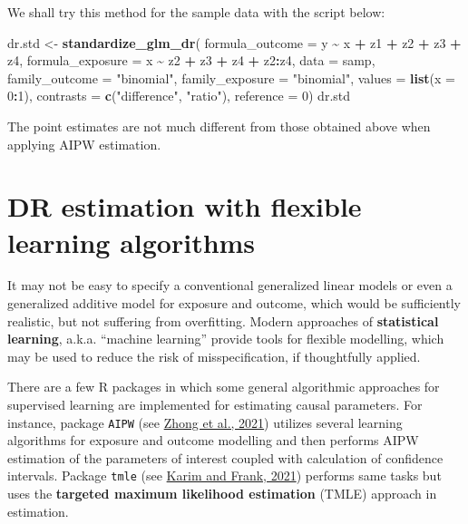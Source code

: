 \documentclass[
]{book}
\newenvironment{Shaded}{\begin{snugshade}}{\end{snugshade}}
\newcommand{\AttributeTok}[1]{\textcolor[rgb]{0.13,0.29,0.53}{#1}}
\newcommand{\DecValTok}[1]{\textcolor[rgb]{0.00,0.00,0.81}{#1}}
\newcommand{\FunctionTok}[1]{\textcolor[rgb]{0.13,0.29,0.53}{\textbf{#1}}}
\newcommand{\NormalTok}[1]{#1}
\newcommand{\OtherTok}[1]{\textcolor[rgb]{0.56,0.35,0.01}{#1}}
\newcommand{\SpecialCharTok}[1]{\textcolor[rgb]{0.81,0.36,0.00}{\textbf{#1}}}
\newcommand{\StringTok}[1]{\textcolor[rgb]{0.31,0.60,0.02}{#1}}
\begin{document}
We shall try this method for the sample data with the script below:

\begin{Shaded}
\begin{Highlighting}[]
\NormalTok{dr.std }\OtherTok{\textless{}{-}} \FunctionTok{standardize\_glm\_dr}\NormalTok{(}
          \AttributeTok{formula\_outcome =}\NormalTok{ y }\SpecialCharTok{\textasciitilde{}}\NormalTok{ x }\SpecialCharTok{+}\NormalTok{ z1 }\SpecialCharTok{+}\NormalTok{ z2 }\SpecialCharTok{+}\NormalTok{ z3 }\SpecialCharTok{+}\NormalTok{ z4, }
          \AttributeTok{formula\_exposure =}\NormalTok{ x }\SpecialCharTok{\textasciitilde{}}\NormalTok{ z2 }\SpecialCharTok{+}\NormalTok{ z3 }\SpecialCharTok{+}\NormalTok{ z4 }\SpecialCharTok{+}\NormalTok{ z2}\SpecialCharTok{:}\NormalTok{z4,}
          \AttributeTok{data =}\NormalTok{ samp,}
          \AttributeTok{family\_outcome =} \StringTok{"binomial"}\NormalTok{, }
          \AttributeTok{family\_exposure =} \StringTok{"binomial"}\NormalTok{,}
          \AttributeTok{values =} \FunctionTok{list}\NormalTok{(}\AttributeTok{x =} \DecValTok{0}\SpecialCharTok{:}\DecValTok{1}\NormalTok{), }
          \AttributeTok{contrasts =} \FunctionTok{c}\NormalTok{(}\StringTok{"difference"}\NormalTok{, }\StringTok{"ratio"}\NormalTok{), }\AttributeTok{reference =} \DecValTok{0}\NormalTok{)}
\NormalTok{dr.std}
\end{Highlighting}
\end{Shaded}

The point estimates are not much different from those obtained above
when applying AIPW estimation.

\section{DR estimation with flexible learning algorithms}\label{dr-estimation-with-flexible-learning-algorithms}

It may not be easy to specify a conventional generalized linear models
or even a generalized additive model for exposure and outcome, which
would be
sufficiently realistic, but not suffering from overfitting. Modern
approaches of \textbf{statistical learning}, a.k.a. ``machine learning''
provide tools for flexible modelling, which may be used to reduce the
risk of misspecification, if thoughtfully applied.

There are a few R packages in which some general algorithmic approaches
for supervised learning are implemented for estimating causal
parameters. For instance, package \texttt{AIPW} (see \href{https://doi.org/10.1093/aje/kwab207}{Zhong et al.,
2021}) utilizes several learning
algorithms for exposure and outcome modelling and then performs AIPW
estimation of the parameters of interest coupled with calculation of
confidence intervals. Package \texttt{tmle} (see \href{https://ehsanx.github.io/TMLEworkshop/}{Karim and Frank,
2021}) performs same tasks but
uses the \textbf{targeted maximum likelihood estimation} (TMLE) approach in
estimation.
\end{document}
